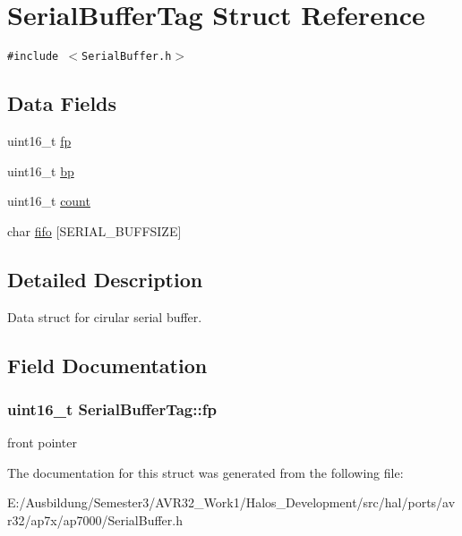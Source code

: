 \hypertarget{struct_serial_buffer_tag}{
\section{SerialBufferTag Struct Reference}
\label{struct_serial_buffer_tag}
}
{\tt \#include $<$SerialBuffer.h$>$}

\subsection*{Data Fields}
\begin{CompactItemize}
\item 
uint16\_\-t \hyperlink{struct_serial_buffer_tag_b77e7a0f55cc8955303b09508bbc22b5}{fp}
\item 
uint16\_\-t \hyperlink{group__serialbuffer_g80fec57b0c1089e49be601c8e154011f}{bp}
\item 
uint16\_\-t \hyperlink{group__serialbuffer_gf764ad82a3af5651722c23326f28adbd}{count}
\item 
char \hyperlink{group__serialbuffer_g0cbebf4bc14ed97a7d673795fccb8f26}{fifo} \mbox{[}SERIAL\_\-BUFFSIZE\mbox{]}
\end{CompactItemize}


\subsection{Detailed Description}
Data struct for cirular serial buffer. 

\subsection{Field Documentation}
\hypertarget{struct_serial_buffer_tag_b77e7a0f55cc8955303b09508bbc22b5}{
\subsubsection[{fp}]{\setlength{\rightskip}{0pt plus 5cm}uint16\_\-t {\bf SerialBufferTag::fp}}}
\label{struct_serial_buffer_tag_b77e7a0f55cc8955303b09508bbc22b5}


front pointer 

The documentation for this struct was generated from the following file:\begin{CompactItemize}
\item 
E:/Ausbildung/Semester3/AVR32\_\-Work1/Halos\_\-Development/src/hal/ports/avr32/ap7x/ap7000/SerialBuffer.h\end{CompactItemize}
